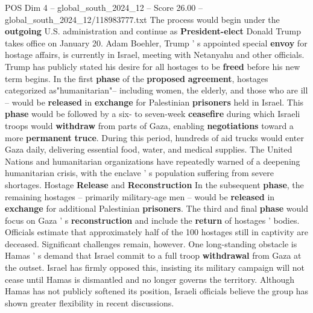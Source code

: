 \begin{textsample}{POS Dim 4 – global\_south\_2024\_12 – Score 26.00 – global\_south\_2024\_12/118983777.txt}
The process would begin under the \textbf{outgoing} U.S. administration and continue as \textbf{President-elect} Donald Trump takes office on January 20.
Adam Boehler, Trump ' s appointed special \textbf{envoy} for hostage affairs, is currently in Israel, meeting with Netanyahu and other officials.
Trump has publicly stated his desire for all hostages to be \textbf{freed} before his new term begins.
In the first \textbf{phase} of the \textbf{proposed} \textbf{agreement}, hostages categorized as"humanitarian"-- including women, the elderly, and those who are ill -- would be \textbf{released} in \textbf{exchange} for Palestinian \textbf{prisoners} held in Israel.
This \textbf{phase} would be followed by a six- to seven-week \textbf{ceasefire} during which Israeli troops would \textbf{withdraw} from parts of Gaza, enabling \textbf{negotiations} toward a more \textbf{permanent} \textbf{truce}.
During this period, hundreds of aid trucks would enter Gaza daily, delivering essential food, water, and medical supplies.
The United Nations and humanitarian organizations have repeatedly warned of a deepening humanitarian crisis, with the enclave ' s population suffering from severe shortages.
Hostage \textbf{Release} and \textbf{Reconstruction} In the subsequent \textbf{phase}, the remaining hostages -- primarily military-age men -- would be \textbf{released} in \textbf{exchange} for additional Palestinian \textbf{prisoners}.
The third and final \textbf{phase} would focus on Gaza ' s \textbf{reconstruction} and include the \textbf{return} of hostages ' bodies.
Officials estimate that approximately half of the 100 hostages still in captivity are deceased.
Significant challenges remain, however.
One long-standing obstacle is Hamas ' s demand that Israel commit to a full troop \textbf{withdrawal} from Gaza at the outset.
Israel has firmly opposed this, insisting its military campaign will not cease until Hamas is dismantled and no longer governs the territory.
Although Hamas has not publicly softened its position, Israeli officials believe the group has shown greater flexibility in recent discussions.

\end{textsample}
